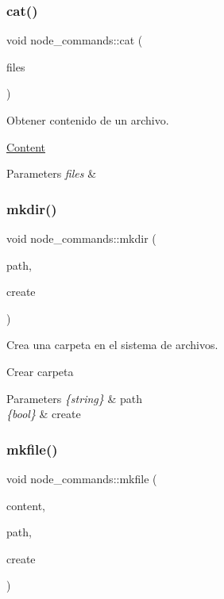 \subsubsection{\texorpdfstring{cat()}{cat()}}
{\footnotesize\ttfamily void node\+\_\+commands\+::cat (\begin{DoxyParamCaption}\item[{\hyperlink{structListProp}{List\+Prop}}]{files }\end{DoxyParamCaption})}



Obtener contenido de un archivo. 

\hyperlink{structContent}{Content} 
\begin{DoxyParams}{Parameters}
{\em files} & \\
\hline
\end{DoxyParams}
\mbox{\label{classnode__commands_ab9bab9521e403fe8b28ea735c6d1215d}} 
\subsubsection{\texorpdfstring{mkdir()}{mkdir()}}
{\footnotesize\ttfamily void node\+\_\+commands\+::mkdir (\begin{DoxyParamCaption}\item[{string}]{path,  }\item[{bool}]{create }\end{DoxyParamCaption})}



Crea una carpeta en el sistema de archivos. 

Crear carpeta 
\begin{DoxyParams}{Parameters}
{\em \{string\}} & path \\
\hline
{\em \{bool\}} & create \\
\hline
\end{DoxyParams}
\mbox{\label{classnode__commands_a53055970bb8b3d57a1b480f3114338cd}} 
\subsubsection{\texorpdfstring{mkfile()}{mkfile()}}
{\footnotesize\ttfamily void node\+\_\+commands\+::mkfile (\begin{DoxyParamCaption}\item[{string}]{content,  }\item[{string}]{path,  }\item[{bool}]{create }\end{DoxyParamCaption})}



